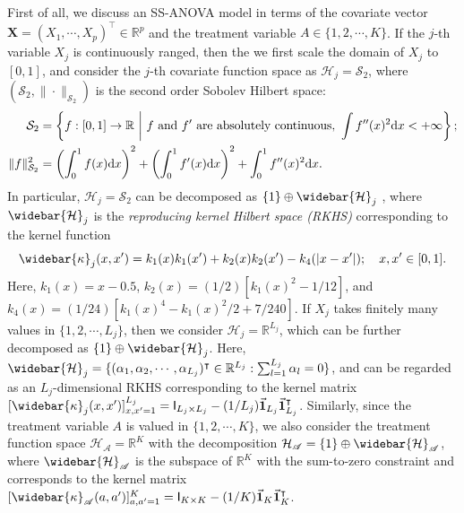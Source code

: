 \documentclass[11pt]{article}
\numberwithin{equation}{section}
\theoremstyle{definition}
\theoremstyle{remark}
\newcommand{\bX}{\bm{X}}
\newcommand{\bbR}{\mathbb{R}}
\newcommand{\cH}{\mathcal{H}}
\newcommand{\cS}{\mathcal{S}}
\newcommand{\sA}{\mathscr{A}}
\newcommand{\sfI}{\mathsf{I}}
\newcommand{\bone}{\mathbf{1}}	%
\newcommand{\rd}{\mathrm{d}}
\begin{document}
First of all, we discuss an SS-ANOVA model in terms of the covariate vector $ \bX=(X_{1},\cdots,X_{p})^{\intercal} \in \bbR^{p} $ and the treatment variable $ A \in \{1,2,\cdots,K\} $. If the $ j $-th variable $ X_{j} $ is continuously ranged, then the we first scale the domain of $ X_{j} $ to $ [0,1] $, and consider the $ j $-th covariate function space as $ \cH_{j} = \cS_{2} $, where $ (\cS_{2},\| \cdot \|_{\cS_{2}}) $ is the second order Sobolev Hilbert space:
\begin{align*}
	\cS_{2} &= \left\{ f:[0,1] \to \bbR~\middle|~\text{$ f $ and $ f' $ are absolutely continuous}, ~ \int f''(x)^{2} \rd x < +\infty \right\};\\
	\| f \|_{\cS_{2}}^{2} &= \left( \int_{0}^{1}f(x)\rd x \right)^{2} + \left( \int_{0}^{1}f'(x)\rd x \right)^{2} + \int_{0}^{1}f''(x)^{2}\rd x.
\end{align*}
In particular, $ \cH_{j} = \cS_{2} $ can be decomposed as $ \{1\} \oplus \widebar{\cH}_{j} $ \citep[Equation (2.26)]{gu2013smoothing}, where $ \widebar{\cH}_{j} $ is the \textit{reproducing kernel Hilbert space (RKHS)} corresponding to the kernel function
\[ \widebar{\kappa}_{j}(x,x') = k_{1}(x)k_{1}(x') + k_{2}(x)k_{2}(x') - k_{4}(|x-x'|); \quad x,x' \in [0,1]. \]
Here, $ k_{1}(x) = x - 0.5 $, $ k_{2}(x) = (1/2)[k_{1}(x)^{2} - 1/12] $, and $ k_{4}(x) = (1/24)[k_{1}(x)^{4} - k_{1}(x)^{2}/2 + 7/240] $. If $ X_{j} $ takes finitely many values in $ \{ 1,2,\cdots,L_{j} \} $, then we consider $ \cH_{j} = \bbR^{L_{j}} $, which can be further decomposed as $ \{1\} \oplus \widebar{\cH}_{j} $. Here, $ \widebar{\cH}_{j} = \{ (\alpha_{1},\alpha_{2},\cdots,\alpha_{L_{j}})^{\intercal} \in \bbR^{L_{j}}: \sum_{l=1}^{L_{j}}\alpha_{l} = 0 \} $, and can be regarded as an $ L_{j} $-dimensional RKHS corresponding to the kernel matrix $ [\widebar{\kappa}_{j}(x,x')]_{x,x'=1}^{L_{j}} = \sfI_{L_{j}\times L_{j}} - (1/L_{j})\vec{\bone}_{L_{j}}\vec{\bone}_{L_{j}}^{\intercal} $. Similarly, since the treatment variable $ A $ is valued in $ \{1,2,\cdots,K\} $, we also consider the treatment function space $ \cH_{\sA} = \bbR^{K} $ with the decomposition $ \cH_{\sA} = \{1\} \oplus \widebar{\cH}_{\sA} $, where $ \widebar{\cH}_{\sA} $ is the subspace of $ \bbR^{K} $ with the sum-to-zero constraint and corresponds to the kernel matrix $ [\widebar{\kappa}_{\sA}(a,a')]_{a,a'=1}^{K} = \sfI_{K\times K} - (1/K)\vec{\bone}_{K}\vec{\bone}_{K}^{\intercal} $.
\end{document}
